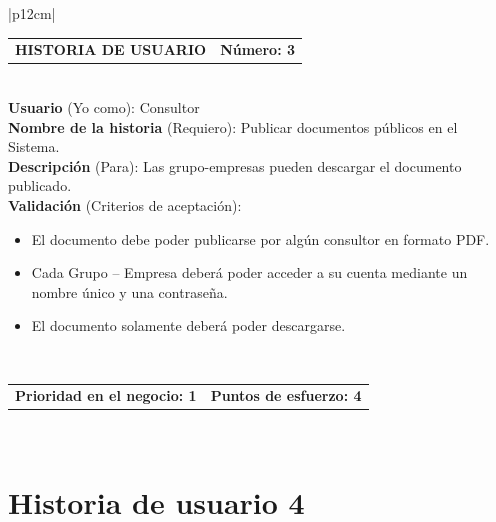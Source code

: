 \documentclass[11pt,letterpaper]{report}
\begin{document}
	\begin{center}	
	\begin{tabular}{|p{12cm}|}
		\hline
		\begin{tabular}{c|c}
			\textbf{HISTORIA DE USUARIO} & \textbf{Número: 3} \\
		\end{tabular} \\ \hline
		\textbf{Usuario} (Yo como): Consultor \\ \hline
		\textbf{Nombre de la historia} (Requiero): Publicar documentos públicos en el Sistema. \\ \hline
		\textbf{Descripción} (Para): Las grupo-empresas pueden descargar el documento publicado. \\ \hline
		\textbf{Validación} (Criterios de aceptación): \\
		\begin{minipage}{12cm}
			\begin{itemize}
				\item El documento debe poder publicarse por algún consultor en formato PDF.
				\item Cada Grupo – Empresa deberá poder acceder a su cuenta mediante un nombre único y una contraseña.
				\item El documento solamente deberá poder descargarse.
			\end{itemize}
		\end{minipage} \\ \hline
		\begin{tabular}{c|c}
			\textbf{Prioridad en el negocio: 1} & \textbf{Puntos de esfuerzo: 4} \\
		\end{tabular} \\ \hline
	\end{tabular}
	\end{center}
	
	\section{Historia de usuario 4}
	
\end{document}
